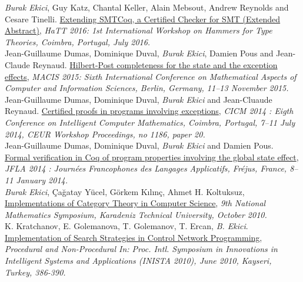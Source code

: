 \documentclass[10pt, a4paper]{article}
\newcommand{\years}[1]{\marginnote{\scriptsize #1}}
\begin{document}
\emph{Burak Ekici}, Guy Katz, Chantal Keller, Alain Mebsout, Andrew Reynolds and Cesare Tinelli.
{\href{http://eptcs.web.cse.unsw.edu.au/paper.cgi?HaTT2016.5}{Extending SMTCoq, a Certified Checker for SMT (Extended Abstract)}}, 
\emph{HaTT 2016: 1st International Workshop on Hammers for Type Theories, Coimbra, Portugal, July 2016.}
 \\[0.20cm]
\years{\normalsize2015}
Jean-Guillaume Dumas, Dominique Duval, \emph{Burak Ekici}, Damien Pous and Jean-Claude Reynaud. 
\href{https://hal.archives-ouvertes.fr/hal-01121924}{Hilbert-Post completeness for the state and the exception effects}, 
\emph{MACIS 2015: Sixth International Conference on Mathematical Aspects of Computer and Information Sciences, Berlin,
Germany, 11–13 November 2015.}
 \\[0.20cm]
\years{\normalsize2014}Jean-Guillaume Dumas, Dominique Duval, \emph{Burak Ekici} and Jean-Cluaude Reynaud. \href{https://hal.archives-ouvertes.fr/hal-00867237}{Certified proofs in programs involving exceptions}, \textit{CICM 2014 : Eigth Conference on Intelligent Computer Mathematics, Coimbra, Portugal, 7--11 July 2014,
CEUR Workshop Proceedings, no 1186, paper 20. }\\[0.25cm]
\years{\normalsize2014}Jean-Guillaume Dumas, Dominique Duval, \emph{Burak Ekici} and Damien Pous.
{\href{https://hal.archives-ouvertes.fr/hal-00869230}{Formal verification in Coq of program properties involving the global state effect}}, \textit{JFLA 2014 : Journées Francophones des Langages Applicatifs, Fréjus, France, 8--11 January 2014. }
 \\[0.20cm]
\years{\normalsize2010} \emph{Burak Ekici}, Çağatay Yücel, Görkem Kılınç, Ahmet H. Koltuksuz,
\href{http://ekiciburak.github.io/}{Implementations of Category Theory in Computer Science}, \emph{9th National Mathematics Symposium, Karadeniz Technical University, October 2010.}
 \\[0.20cm]
\years{\normalsize2010} K. Kratchanov, E. Golemanova, T. Golemanov, T. Ercan, \emph{B. Ekici}.
\href{http://arxiv.org/abs/1412.4184}{Implementation of Search Strategies in Control Network Programming}, \emph{Procedural and Non-Procedural In: Proc. Intl. Symposium in Innovations in Intelligent Systems
and Applications (INISTA 2010), June 2010, Kayseri, Turkey, 386-390.}
\end{document}
